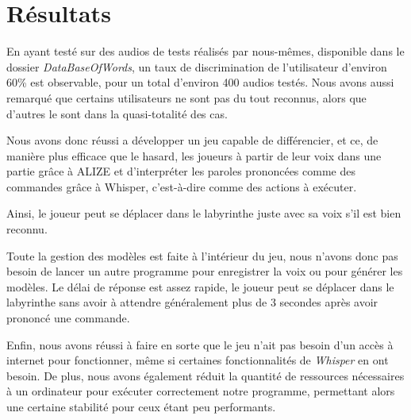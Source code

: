 \section{Résultats}
\label{sec:resultats}

En ayant testé sur des audios de tests réalisés par nous-mêmes, disponible dans le dossier \textit{DataBaseOfWords}, un taux de discrimination de l'utilisateur d'environ 60\% est observable, pour un total d'environ 400 audios testés. Nous avons aussi remarqué que certains utilisateurs ne sont pas du tout reconnus, alors que d'autres le sont dans la quasi-totalité des cas.

Nous avons donc réussi a développer un jeu capable de différencier, et ce, de manière plus efficace que le hasard, les joueurs à partir de leur voix dans une partie grâce à ALIZE et d'interpréter les paroles prononcées comme des commandes grâce à Whisper, c'est-à-dire comme des
actions à exécuter. 

Ainsi, le joueur peut se déplacer dans le labyrinthe juste avec sa voix s'il est bien reconnu. 

Toute la gestion des modèles est faite à l'intérieur du jeu, nous n'avons donc pas besoin de lancer un autre programme pour enregistrer la voix ou pour générer les modèles. 
Le délai de réponse est assez rapide, le joueur peut se déplacer dans le labyrinthe sans avoir à attendre généralement plus de 3 secondes après avoir prononcé une commande. 

Enfin, nous avons réussi à faire en sorte que le jeu n'ait pas besoin d'un accès à internet pour fonctionner, même si certaines fonctionnalités de \textit{Whisper} en ont besoin.
De plus, nous avons également réduit la quantité de ressources nécessaires à un ordinateur pour exécuter correctement notre programme, permettant alors une certaine stabilité pour ceux étant peu performants.
